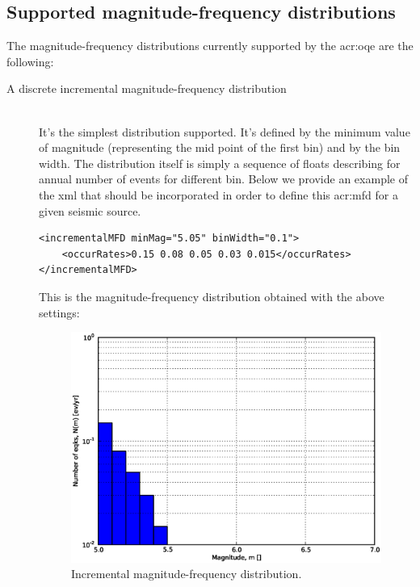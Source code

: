 \subsection{Supported magnitude-frequency distributions}
The magnitude-frequency distributions currently supported by the 
\gls{acr:oqe} are the following: 
\begin{description}
    \item[A discrete incremental magnitude-frequency distribution] \hfill \\
    It's the simplest distribution supported. It's defined by the 
    minimum value of magnitude (representing the mid point of the first
    bin) and by the bin width. The distribution itself is simply a 
    sequence of floats describing for annual number of events for 
    different bin. Below we provide an example of the xml that should
    be incorporated in order to define this \gls{acr:mfd} for a given
    seismic source.
\begin{Verbatim}[frame=single, commandchars=\\\{\}, fontsize=\footnotesize]
<incrementalMFD minMag="5.05" binWidth="0.1">
    <occurRates>0.15 0.08 0.05 0.03 0.015</occurRates>
</incrementalMFD>
\end{Verbatim}
    This is the magnitude-frequency distribution obtained with the above
    settings:
\begin{figure}[!ht]
\centering
\includegraphics[width=12cm]{./figures/hazard/ed_mfd.eps}
\caption{Incremental magnitude-frequency distribution.}
\label{fig:evenly_discretized_mfd}

\end{figure}
\end{description}
